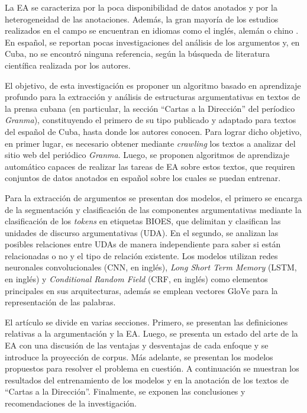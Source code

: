 \documentclass{rcci} %
\begin{document}
La EA se caracteriza por la poca disponibilidad de datos anotados y 
por la heterogeneidad de las 
anotaciones. Adem\'as, la gran mayor\'ia de los estudios realizados en el campo se encuentran en 
idiomas como el ingl\'es, alem\'an o chino \cite{eger2018cross}. 
En espa\~nol, se reportan pocas investigaciones del an\'alisis de los argumentos \cite{esteve2020mineria} y, en 
Cuba, no se encontr\'o ninguna referencia, seg\'un la b\'usqueda de literatura cient\'ifica
realizada por los autores.

El objetivo, de esta investigaci\'on es proponer un algoritmo basado en aprendizaje profundo 
para la extracci\'on y an\'alisis de estructuras argumentativas en textos 
de la prensa cubana (en particular, la secci\'on ``Cartas a la Direcci\'on'' del per\'iodico \textit{Granma}), 
constituyendo el primero de su tipo publicado y adaptado para
textos del espa\~nol de Cuba, hasta donde los autores conocen. 
Para lograr dicho objetivo, en primer lugar, es necesario obtener mediante \textit{crawling} los textos a analizar del sitio 
web del peri\'odico \textit{Granma}. Luego, se proponen algoritmos de aprendizaje autom\'atico capaces de realizar las tareas 
de EA sobre estos textos, que requiren conjuntos 
de datos anotados en espa\~nol sobre los cuales se puedan entrenar.

Para la extracci\'on
de argumentos se presentan dos modelos, el primero se encarga de la segmentaci\'on y clasificaci\'on
de las componentes argumentativas mediante la clasificaci\'on de los \textit{tokens} en etiquetas BIOES, que %
delimitan y clasifican las unidades de discurso argumentativas (UDA). En el segundo, se analizan 
las posibles relaciones entre UDAs de manera independiente para saber si est\'an relacionadas o no y
el tipo de relaci\'on existente. Los modelos utilizan 
redes neuronales convolucionales (CNN, en ingl\'es), \textit{Long Short Term Memory} (LSTM, en ingl\'es) \cite{hochreiter1997long} y \textit{Conditional Random Field} (CRF, en ingl\'es) \cite{lafferty2001conditional}
como elementos principales en sus arquitecturas, adem\'as se emplean vectores GloVe \cite{pennington2014glove} para la representaci\'on
de las palabras. 

El art\'iculo se divide en varias secciones. Primero, se presentan las definiciones 
relativas a la argumentaci\'on y la EA. Luego, se presenta 
un estado del arte de la EA con una discusi\'on de las
ventajas y desventajas de cada enfoque y se introduce la proyecci\'on de corpus. M\'as adelante, 
se presentan los modelos propuestos para resolver el problema en 
cuesti\'on. A continuaci\'on se muestran los resultados del entrenamiento de los modelos y en 
la anotaci\'on de los textos de ``Cartas a la Direcci\'on''. Finalmente, se exponen las conclusiones y 
recomendaciones de la investigaci\'on.
\end{document}
